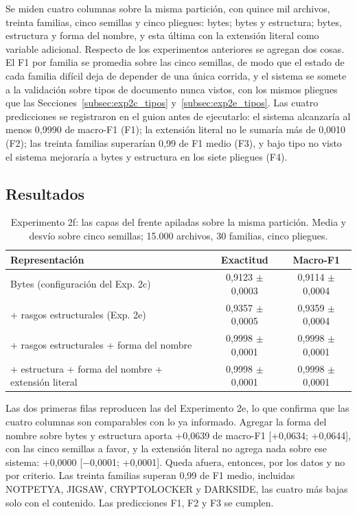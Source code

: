 Se miden cuatro columnas sobre la misma partición, con quince mil archivos, treinta familias, cinco semillas y cinco pliegues: bytes; bytes y estructura; bytes, estructura y forma del nombre, y esta última con la extensión literal como variable adicional. Respecto de los experimentos anteriores se agregan dos cosas. El F1 por familia se promedia sobre las cinco semillas, de modo que el estado de cada familia difícil deja de depender de una única corrida, y el sistema se somete a la validación sobre tipos de documento nunca vistos, con los mismos pliegues que las Secciones~\ref{subsec:exp2c_tipos} y~\ref{subsec:exp2e_tipos}. Las cuatro predicciones se registraron en el guion antes de ejecutarlo: el sistema alcanzaría al menos 0,9990 de macro-F1 (F1); la extensión literal no le sumaría más de 0,0010 (F2); las treinta familias superarían 0,99 de F1 medio (F3), y bajo tipo no visto el sistema mejoraría a bytes y estructura en los siete pliegues (F4).

\subsection{Resultados}

\begin{table}[ht]
\centering
\caption{Experimento 2f: las capas del frente apiladas sobre la misma partición. Media y desvío sobre cinco semillas; 15.000 archivos, 30 familias, cinco pliegues.}
\label{tab:exp2f}
\begin{tabular}{|l|c|c|}
\hline
\textbf{Representación} & \textbf{Exactitud} & \textbf{Macro-F1} \\
\hline
Bytes (configuración del Exp. 2c) & 0,9123 $\pm$ 0,0003 & 0,9114 $\pm$ 0,0004 \\
+ rasgos estructurales (Exp. 2e) & 0,9357 $\pm$ 0,0005 & 0,9359 $\pm$ 0,0004 \\
+ rasgos estructurales + forma del nombre & 0,9998 $\pm$ 0,0001 & 0,9998 $\pm$ 0,0001 \\
+ estructura + forma del nombre + extensión literal & 0,9998 $\pm$ 0,0001 & 0,9998 $\pm$ 0,0001 \\
\hline
\end{tabular}
\end{table}

Las dos primeras filas reproducen las del Experimento 2e, lo que confirma que las cuatro columnas son comparables con lo ya informado. Agregar la forma del nombre sobre bytes y estructura aporta +0,0639 de macro-F1 [+0,0634; +0,0644], con las cinco semillas a favor, y la extensión literal no agrega nada sobre ese sistema: +0,0000 [$-$0,0001; +0,0001]. Queda afuera, entonces, por los datos y no por criterio. Las treinta familias superan 0,99 de F1 medio, incluidas NOTPETYA, JIGSAW, CRYPTOLOCKER y DARKSIDE, las cuatro más bajas solo con el contenido. Las predicciones F1, F2 y F3 se cumplen.

